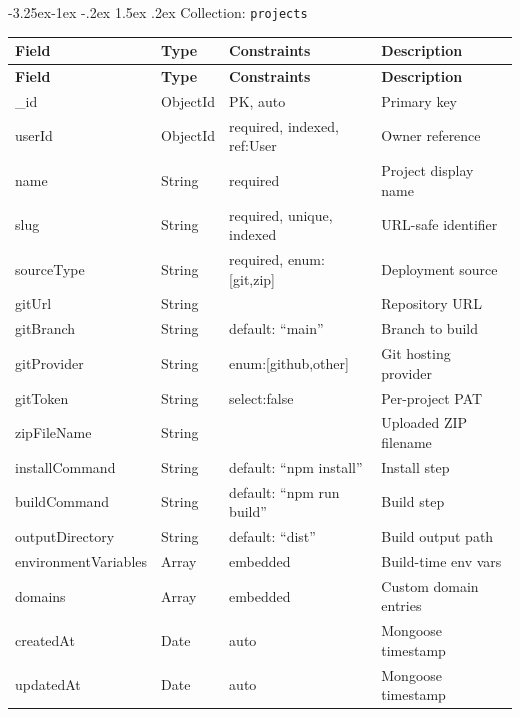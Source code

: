 \documentclass[12pt,a4paper]{article}
\makeatletter
\renewcommand\subsubsection{\@startsection{subsubsection}{3}{\z@}%
  {-3.25ex\@plus -1ex \@minus -.2ex}%
  {1.5ex \@plus .2ex}%
  {\normalfont\normalsize\bfseries}}
\makeatother
\begin{document}
\subsubsection{Collection: \texttt{projects}}
{\small
\begin{longtable}{|l|l|l|>{\raggedright\arraybackslash}p{4cm}|}
\hline
\textbf{Field} & \textbf{Type} & \textbf{Constraints} & \textbf{Description} \\
\hline
\endfirsthead
\hline
\textbf{Field} & \textbf{Type} & \textbf{Constraints} & \textbf{Description} \\
\hline
\endhead
\_id & ObjectId & PK, auto & Primary key \\
\hline
userId & ObjectId & required, indexed, ref:User & Owner reference \\
\hline
name & String & required & Project display name \\
\hline
slug & String & required, unique, indexed & URL-safe identifier \\
\hline
sourceType & String & required, enum:[git,zip] & Deployment source \\
\hline
gitUrl & String & & Repository URL \\
\hline
gitBranch & String & default: ``main'' & Branch to build \\
\hline
gitProvider & String & enum:[github,other] & Git hosting provider \\
\hline
gitToken & String & select:false & Per-project PAT \\
\hline
zipFileName & String & & Uploaded ZIP filename \\
\hline
installCommand & String & default: ``npm install'' & Install step \\
\hline
buildCommand & String & default: ``npm run build'' & Build step \\
\hline
outputDirectory & String & default: ``dist'' & Build output path \\
\hline
environmentVariables & Array & embedded & Build-time env vars \\
\hline
domains & Array & embedded & Custom domain entries \\
\hline
createdAt & Date & auto & Mongoose timestamp \\
\hline
updatedAt & Date & auto & Mongoose timestamp \\
\hline
\end{longtable}
}
\end{document}
